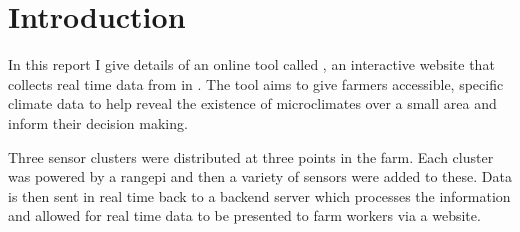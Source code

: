 \section{Introduction}

In this report I give details of an online tool called \myReportTitle{}, an
interactive website that collects real time data from \farmName{} in
\farmLocation{}. The tool aims to give farmers accessible, specific climate data
to help reveal the existence of microclimates over a small area and inform their
decision making.

Three sensor clusters were distributed at three points in the farm. Each
cluster was powered by a rangepi and then a variety of sensors
were added to these. Data is then sent in real time back to a backend server
which processes the information and allowed for real time data to be presented
to farm workers via a website.
